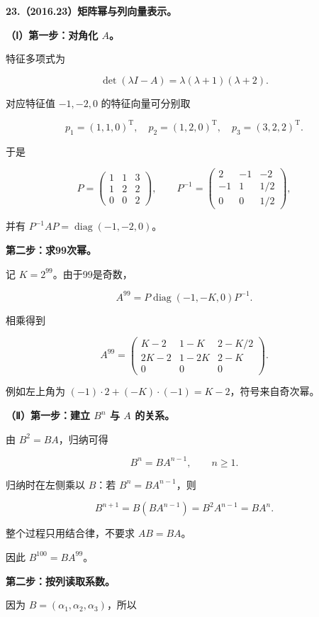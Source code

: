 \documentclass[UTF8,11pt,fontset=windows]{ctexart}
\begin{document}
\textbf{23.（2016.23）矩阵幂与列向量表示。}

\textbf{（Ⅰ）第一步：对角化 $A$。}

特征多项式为

$$
\det(\lambda I-A)=\lambda(\lambda+1)(\lambda+2).
$$

对应特征值 $-1,-2,0$ 的特征向量可分别取

$$
p_1=(1,1,0)^{\mathrm T},\quad
p_2=(1,2,0)^{\mathrm T},\quad
p_3=(3,2,2)^{\mathrm T}.
$$

于是

$$
P=\begin{pmatrix}1&1&3\\1&2&2\\0&0&2\end{pmatrix},
\qquad
P^{-1}=\begin{pmatrix}2&-1&-2\\-1&1&1/2\\0&0&1/2\end{pmatrix},
$$

并有 $P^{-1}AP=\operatorname{diag}(-1,-2,0)$。

\textbf{第二步：求99次幂。}

记 $K=2^{99}$。由于99是奇数，

$$
A^{99}=P\operatorname{diag}(-1,-K,0)P^{-1}.
$$

相乘得到

$$
A^{99}=\begin{pmatrix}
K-2&1-K&2-K/2\\
2K-2&1-2K&2-K\\
0&0&0
\end{pmatrix}.
$$

例如左上角为 $(-1)\cdot2+(-K)\cdot(-1)=K-2$，符号来自奇次幂。

\textbf{（Ⅱ）第一步：建立 $B^n$ 与 $A$ 的关系。}

由 $B^2=BA$，归纳可得

$$
B^n=BA^{n-1},\qquad n\ge1.
$$

归纳时在左侧乘以 $B$：若 $B^n=BA^{n-1}$，则

$$
B^{n+1}=B(BA^{n-1})=B^2A^{n-1}=BA^n.
$$

整个过程只用结合律，不要求 $AB=BA$。

因此 $B^{100}=BA^{99}$。

\textbf{第二步：按列读取系数。}

因为 $B=(\alpha_1,\alpha_2,\alpha_3)$，所以
\end{document}
